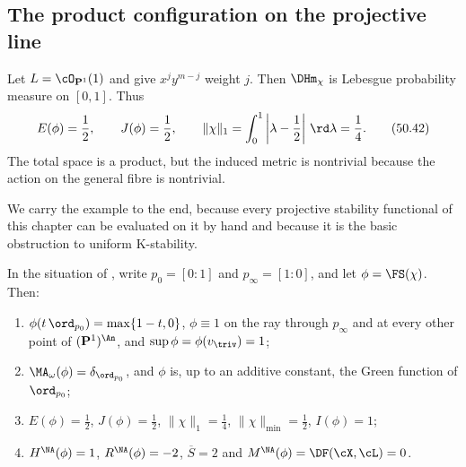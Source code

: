 \subsection{The product configuration on the projective line}
\label{sec:ch50-p1-product}

\begin{example}
\label{ex:stability-p1-product}
Let $L=\cO_{\mathbf P^1}(1)$ and give $x^jy^{m-j}$ weight $j$.
Then $\DHm_\chi$ is Lebesgue probability measure on $[0,1]$.  Thus
\[
 E(\phi)=\frac12,\qquad J(\phi)=\frac12,\qquad
 \|\chi\|_1=\int_0^1\left|\lambda-\frac12\right|\,\rd\lambda=\frac14.
\tag{50.42}\label{eq:stability-p1-numbers}
\]
The total space is a product, but the induced metric is nontrivial because
the action on the general fibre is nontrivial.
\end{example}

We carry the example to the end, because every projective stability
functional of this chapter
can be evaluated on it by hand and because it is the basic obstruction to
uniform K-stability.

\begin{proposition}
\label{prop:ch50-p1-product}
In the situation of , write
$p_0=[0:1]$ and $p_\infty=[1:0]$, and let
$\phi=\FS(\chi)$.  Then:
\begin{enumerate}
\item\label{itm:ch50-p1p:fs}
      $\phi(t\,\ord_{p_0})=\max\{1-t,0\}$, $\phi\equiv1$ on the ray
      through $p_\infty$ and at every other point of
      $(\mathbf P^1)^{\An}$, and $\sup\phi=\phi(v_{\triv})=1$;
\item\label{itm:ch50-p1p:ma}
      $\MA_\omega(\phi)=\delta_{\ord_{p_0}}$, and $\phi$ is, up to an
      additive constant, the Green function of $\ord_{p_0}$;
\item\label{itm:ch50-p1p:numbers}
      $E(\phi)=\tfrac12$, $J(\phi)=\tfrac12$,
      $\|\chi\|_1=\tfrac14$,
      $\|\chi\|_{\min}=\tfrac12$, $I(\phi)=1$;
\item\label{itm:ch50-p1p:mabuchi}
      $H^{\NA}(\phi)=1$, $R^{\NA}(\phi)=-2$, $\overline S=2$ and
      $M^{\NA}(\phi)=\DF(\cX,\cL)=0$.
\end{enumerate}
\end{proposition}

